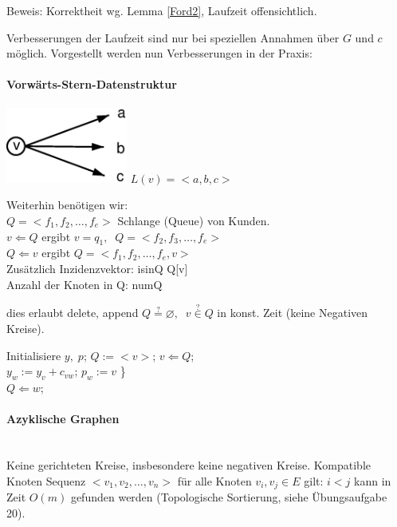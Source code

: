 Beweis: Korrektheit wg. Lemma \ref{Ford2}, Laufzeit offensichtlich.

Verbesserungen der Laufzeit sind nur bei speziellen Annahmen über $G$ und
$c$ möglich. Vorgestellt werden nun Verbesserungen in der Praxis:

\paragraph{Vorwärts-Stern-Datenstruktur}
\mbox{} 

\includegraphics[width=4cm]{bilder/2-2VorwaertsStern} $L(v)=<a,b,c>$

Weiterhin benötigen wir:\\
$Q= <f_{1}, f_{2}, \ldots, f_{e}>$ Schlange (Queue) von Kunden.\\
$v \Leftarrow Q$ ergibt $v=q_{1},\; \;  Q = <f_{2}, f_{3}, \ldots,
f_{e}>$\\
$Q \Leftarrow v$ ergibt $Q= <f_{1}, f_{2}, \ldots, f_{e}, v>$\\
Zusätzlich Inzidenzvektor: isinQ Q[v]\\
Anzahl der Knoten in Q: numQ 

dies erlaubt delete, append $Q \stackrel{?}{=} \varnothing, \; \; v \stackrel{?}{\in} Q$ in konst.
Zeit (keine Negativen Kreise).

\begin{algorithmic}
\STATE Initialisiere $y,\;p$;
\STATE $Q:= <v>$;
\STATE $v \Leftarrow Q$;\\
\STATE $y_{w} := y_{v} + c_{v w}$; $p_{w} := v$ \}\\
\STATE $Q \Leftarrow w$;
\ENDIF
\ENDIF
\ENDFOR
\ENDWHILE
\end{algorithmic}

\paragraph{Azyklische Graphen}
\mbox{}\\
Keine gerichteten Kreise, insbesondere keine negativen Kreise. Kompatible
Knoten Sequenz $<v_{1}, v_{2}, \ldots, v_{n}>$ für alle Knoten $v_{i},
v_{j} \in E$ gilt: $i < j$ kann in Zeit $O(m)$ gefunden werden (Topologische
Sortierung, siehe Übungsaufgabe 20).

